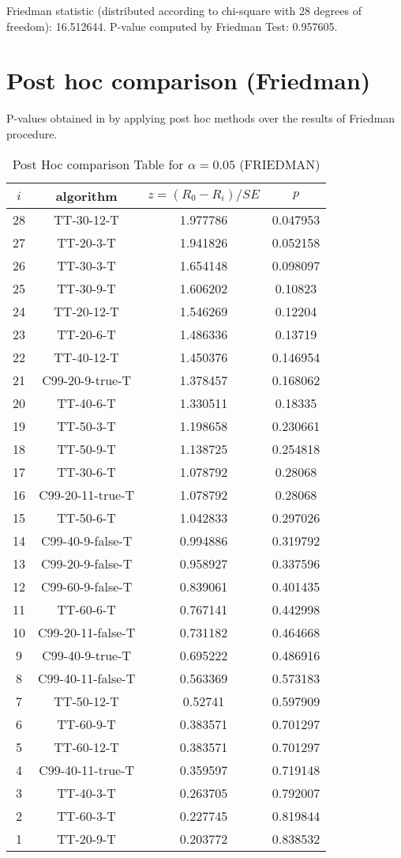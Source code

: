 \documentclass[a4paper,10pt]{article}
\begin{document}
\begin{landscape}
Friedman statistic (distributed according to chi-square with 28 degrees of freedom): 16.512644. \newline P-value computed by Friedman Test: 0.957605.\newline


\newpage

\section{Post hoc comparison (Friedman)}


P-values obtained in by applying post hoc methods over the results of Friedman procedure.

\begin{table}[!htp]
\centering\footnotesize
\begin{tabular}{cccc}
$i$&algorithm&$z=(R_0 - R_i)/SE$&$p$\\
\hline28&TT-30-12-T&1.977786&0.047953\\27&TT-20-3-T&1.941826&0.052158\\26&TT-30-3-T&1.654148&0.098097\\25&TT-30-9-T&1.606202&0.10823\\24&TT-20-12-T&1.546269&0.12204\\23&TT-20-6-T&1.486336&0.13719\\22&TT-40-12-T&1.450376&0.146954\\21&C99-20-9-true-T&1.378457&0.168062\\20&TT-40-6-T&1.330511&0.18335\\19&TT-50-3-T&1.198658&0.230661\\18&TT-50-9-T&1.138725&0.254818\\17&TT-30-6-T&1.078792&0.28068\\16&C99-20-11-true-T&1.078792&0.28068\\15&TT-50-6-T&1.042833&0.297026\\14&C99-40-9-false-T&0.994886&0.319792\\13&C99-20-9-false-T&0.958927&0.337596\\12&C99-60-9-false-T&0.839061&0.401435\\11&TT-60-6-T&0.767141&0.442998\\10&C99-20-11-false-T&0.731182&0.464668\\9&C99-40-9-true-T&0.695222&0.486916\\8&C99-40-11-false-T&0.563369&0.573183\\7&TT-50-12-T&0.52741&0.597909\\6&TT-60-9-T&0.383571&0.701297\\5&TT-60-12-T&0.383571&0.701297\\4&C99-40-11-true-T&0.359597&0.719148\\3&TT-40-3-T&0.263705&0.792007\\2&TT-60-3-T&0.227745&0.819844\\1&TT-20-9-T&0.203772&0.838532\\\hline
\end{tabular}
\caption{Post Hoc comparison Table for $\alpha=0.05$ (FRIEDMAN)}
\end{table}
\newpage


\end{landscape}
\end{document}
